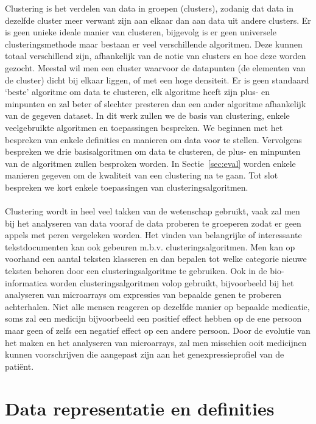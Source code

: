 \documentclass[a4paper,12pt]{article}
\theoremstyle{definition}
\begin{document}
Clustering is het verdelen van data in groepen (clusters), zodanig dat data in
dezelfde cluster meer verwant zijn aan elkaar dan aan data uit andere clusters.
Er is geen unieke ideale manier van clusteren, bijgevolg is er geen universele
clusteringsmethode maar bestaan er veel verschillende algoritmen.
Deze kunnen totaal verschillend zijn, afhankelijk van de notie van clusters en
hoe deze worden gezocht. Meestal wil men een cluster waarvoor
de datapunten (de elementen van de cluster) dicht bij elkaar liggen, of met een hoge
densiteit. Er is geen standaard `beste' algoritme om data te clusteren,
elk algoritme heeft zijn plus- en minpunten en zal beter of slechter presteren
dan een ander algoritme afhankelijk van de gegeven dataset.
In dit werk zullen we de basis van clustering, enkele veelgebruikte algoritmen
en toepassingen bespreken.
We beginnen met het bespreken van enkele definities en manieren om data voor te
stellen. Vervolgens bespreken we drie basisalgoritmen om data te clusteren, de 
plus- en minpunten van de algoritmen zullen besproken worden. In 
Sectie~\ref{sec:eval} worden enkele manieren gegeven om de kwaliteit van een
clustering na te gaan. Tot slot bespreken we kort enkele toepassingen van 
clusteringsalgoritmen.\\
\ \\
Clustering wordt in heel veel takken van de wetenschap gebruikt, 
vaak zal men bij het analyseren van data vooraf de data proberen te groeperen zodat
er geen appels met peren vergeleken worden. Het vinden van belangrijke of interessante
tekstdocumenten kan ook gebeuren m.b.v. clusteringsalgoritmen. Men kan op voorhand
een aantal teksten klasseren en dan bepalen tot welke categorie nieuwe teksten
behoren door een clusteringsalgoritme te gebruiken. Ook in de bio-informatica
worden clusteringsalgoritmen volop gebruikt, bijvoorbeeld bij het analyseren
van microarrays om expressies van bepaalde genen te proberen achterhalen.
Niet alle mensen reageren op dezelfde manier op bepaalde medicatie, soms zal
een medicijn bijvoorbeeld een positief effect hebben op de ene persoon maar geen
of zelfs een negatief effect op een andere persoon. Door de evolutie van het maken
en het analyseren van microarrays, zal men mis\-schien ooit medicijnen kunnen voorschrijven
die aangepast zijn aan het genexpressieprofiel van de patiënt.

\newpage
\section{Data representatie en definities}
\end{document}
